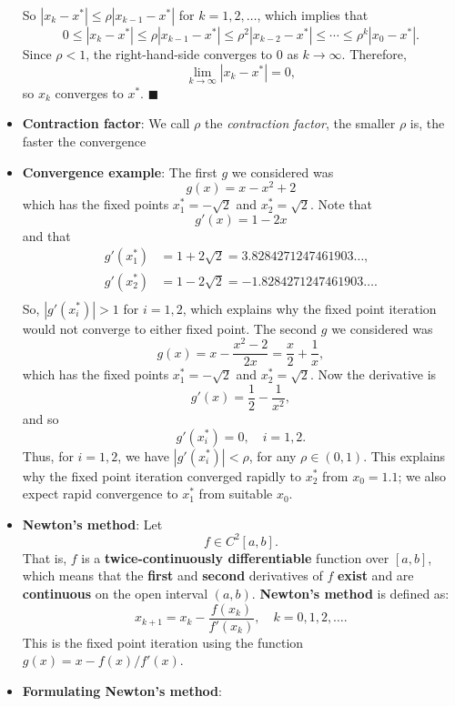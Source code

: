 \documentclass{report}
\begin{document}
\begin{itemize}
    So $\left|x_k - x^*\right| \leq \rho \left|x_{k-1} - x^*\right|$ for $k = 1, 2, \ldots$, which implies that
    $$ 0 \le \left|x_k - x^*\right| \leq \rho \left|x_{k-1} - x^*\right| \leq \rho^2 \left|x_{k-2} - x^*\right| \leq \cdots \leq \rho^k \left|x_{0} - x^*\right|.$$
    Since $\rho < 1$, the right-hand-side converges to $0$ as $k \to \infty$. Therefore,
    $$ \lim_{k \to \infty} \left|x_k - x^*\right| = 0,$$
    so $x_k$ converges to $x^*$. $\blacksquare$
\item \textbf{Contraction factor}: We call $\rho$ the \textit{contraction factor}, the smaller $\rho$ is, the faster the convergence
\item \textbf{Convergence example}:
    The first $g$ we considered was
    $$g(x) = x - x^2 + 2$$
    which has the fixed points $x_1^* = -\sqrt{2}$ and $x_2^* = \sqrt{2}$. Note that
    $$g'(x) = 1 - 2x$$
    and that 
    \begin{align*}
        g'(x_1^*) & = 1 + 2\sqrt{2} = 3.8284271247461903\ldots, \\
        g'(x_2^*) & = 1 - 2\sqrt{2} = -1.8284271247461903\ldots. \\
    \end{align*}
    So, $\left|g'(x_i^*)\right| > 1$ for $i=1,2$, which explains why the fixed point iteration would not converge to either fixed point.
    \bigbreak \noindent 
    The second $g$ we considered was
    $$g(x) = x - \frac{x^2 - 2}{2x} = \frac{x}{2} + \frac{1}{x},$$
    which has the fixed points $x_1^* = -\sqrt{2}$ and $x_2^* = \sqrt{2}$. Now the derivative is
    $$g'(x) = \frac{1}{2} - \frac{1}{x^2},$$
    and so
    $$g'(x_i^*) = 0, \quad i=1,2.$$
    Thus, for $i=1,2$, we have $\left|g'(x_i^*)\right| < \rho$, for any $\rho \in (0,1)$. This explains why the fixed point iteration converged rapidly to $x_2^*$ from $x_0 = 1.1$; we also expect rapid convergence to $x_1^*$ from suitable $x_0$.
\item \textbf{Newton's method}:
    Let 
    \[
        f \in C^2[a,b].
    \]
    That is, \( f \) is a \textbf{twice-continuously differentiable} function over \([a,b]\), which means that the \textbf{first} and \textbf{second} derivatives of \( f \) \textbf{exist} and are \textbf{continuous} on the open interval \( (a,b) \). \textbf{Newton's method} is defined as:
    \[
        x_{k+1} = x_k - \frac{f(x_k)}{f'(x_k)}, \quad k = 0, 1, 2, \ldots.
    \]
    This is the fixed point iteration using the function \( g(x) = x - f(x)\big/ f'(x) \).
\item \textbf{Formulating Newton's method}:

\end{itemize}
\end{document}
